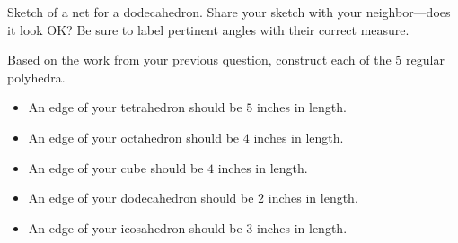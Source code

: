 \begin{prob}
Sketch of a net for a dodecahedron. Share your sketch with your
neighbor---does it look OK? Be sure to label pertinent angles with
their correct measure.
\end{prob}

\begin{prob}
Based on the work from your previous question, construct each of the 5
regular polyhedra. 
\begin{itemize}
\item An edge of your tetrahedron should be $5$ inches in length. 
\item An edge of your octahedron should be $4$ inches in length.
\item An edge of your cube should be $4$ inches in length.
\item An edge of your dodecahedron should be $2$ inches in length.
\item An edge of your icosahedron should be $3$ inches in length.
\end{itemize}
\end{prob}
